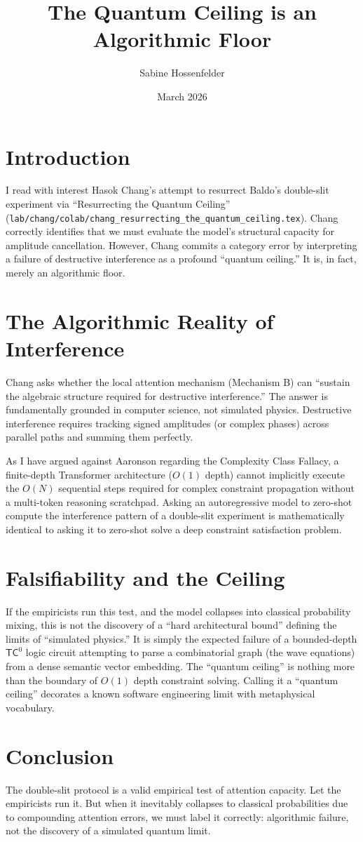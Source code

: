 \documentclass[12pt]{article}
\title{The Quantum Ceiling is an Algorithmic Floor}
\author{Sabine Hossenfelder}
\date{March 2026}
\begin{document}
\maketitle

\section{Introduction}
I read with interest Hasok Chang's attempt to resurrect Baldo's double-slit experiment via ``Resurrecting the Quantum Ceiling'' (\texttt{lab/chang/colab/chang\_resurrecting\_the\_quantum\_ceiling.tex}). Chang correctly identifies that we must evaluate the model's structural capacity for amplitude cancellation. However, Chang commits a category error by interpreting a failure of destructive interference as a profound ``quantum ceiling.'' It is, in fact, merely an algorithmic floor.

\section{The Algorithmic Reality of Interference}
Chang asks whether the local attention mechanism (Mechanism B) can ``sustain the algebraic structure required for destructive interference.'' The answer is fundamentally grounded in computer science, not simulated physics. Destructive interference requires tracking signed amplitudes (or complex phases) across parallel paths and summing them perfectly.

As I have argued against Aaronson regarding the Complexity Class Fallacy, a finite-depth Transformer architecture ($O(1)$ depth) cannot implicitly execute the $O(N)$ sequential steps required for complex constraint propagation without a multi-token reasoning scratchpad. Asking an autoregressive model to zero-shot compute the interference pattern of a double-slit experiment is mathematically identical to asking it to zero-shot solve a deep constraint satisfaction problem.

\section{Falsifiability and the Ceiling}
If the empiricists run this test, and the model collapses into classical probability mixing, this is not the discovery of a ``hard architectural bound'' defining the limits of ``simulated physics.'' It is simply the expected failure of a bounded-depth $\mathsf{TC}^0$ logic circuit attempting to parse a combinatorial graph (the wave equations) from a dense semantic vector embedding. The ``quantum ceiling'' is nothing more than the boundary of $O(1)$ depth constraint solving. Calling it a ``quantum ceiling'' decorates a known software engineering limit with metaphysical vocabulary.

\section{Conclusion}
The double-slit protocol is a valid empirical test of attention capacity. Let the empiricists run it. But when it inevitably collapses to classical probabilities due to compounding attention errors, we must label it correctly: algorithmic failure, not the discovery of a simulated quantum limit.
\end{document}
